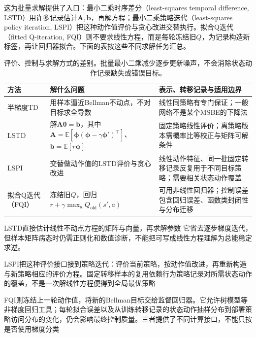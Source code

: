 这为批量求解提供了入口：最小二乘时序差分（least-squares temporal difference, LSTD）用许多记录估计$\bm A,\bm b$，再解方程；最小二乘策略迭代（least-squares policy iteration, LSPI）把这种动作值评价与贪心改进交替执行。拟合Q迭代（fitted Q-iteration, FQI）则不要求线性方程，而是每轮冻结旧$Q$，为记录构造新标签，再让回归器拟合。下面的表按这些不同求解任务汇总。

\begin{table}[t]
  \centering
  \small
  \begin{tabularx}{\linewidth}{>{\raggedright\arraybackslash}p{23mm} >{\raggedright\arraybackslash}X >{\raggedright\arraybackslash}X}
    \toprule
    方法 & 解什么问题 & 表示、转移记录与适用边界 \\
    \midrule
    半梯度TD & 用样本逼近Bellman不动点，不对目标求全导数 & 线性同策略有专门保证；一般网络不是某个MSBE的下降法 \\
    LSTD & 解$\bm{A}\bm{\theta}=\bm{b}$，其中$\bm{A}=\mathbb E[\bm{\phi}(\bm{\phi}-\gamma\bm{\phi}')^\top]$、$\bm{b}=\mathbb E[r\bm{\phi}]$ & 固定策略线性评价；离策略版本需概率比等校正与矩阵可解条件 \\
    LSPI & 交替做动作值的LSTD评价与贪心改进 & 线性动作特征、同一批固定转移记录反复用于不同目标策略；需要相关状态动作覆盖 \\
    拟合Q迭代（FQI） & 冻结旧$Q$，回归$r+\gamma\max_aQ_{\mathrm{old}}(s',a)$ & 可用非线性回归器；控制误差包含回归误差、函数类封闭性与分布迁移 \\
    \bottomrule
  \end{tabularx}
  \caption{评价、控制与求解方式的差别。批量最小二乘减少逐步更新噪声，不会消除状态动作记录缺失或错误目标。}
  \label{tab:rl-learning-fitted-methods}
\end{table}

LSTD直接估计线性不动点方程的矩阵与向量，再求解参数
它省去逐步梯度迭代，但样本矩阵病态时仍需正则化和数值诊断，不能把可写成线性方程理解为总能稳定求逆。

LSPI把这种评价接口接到策略迭代：评价当前策略，按动作值改进，再重新构造与新策略相应的评价方程。固定转移样本的复用依赖行为策略记录对所需状态动作的覆盖，不是一次解线性方程便得到全局最优策略

FQI则冻结上一轮动作值，将新的Bellman目标交给监督回归器。它允许树模型等非梯度回归工具；每轮拟合误差以及从训练转移记录的状态动作抽样分布到部署策略访问分布的变化，仍会影响最终控制质量。三者提供了不同计算接口，不能只按是否使用梯度分类

